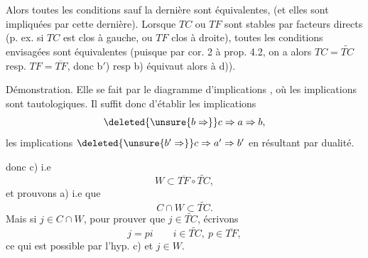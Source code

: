 
Alors toutes les conditions sauf la dernière sont
équivalentes, (et elles sont  impliquées par cette dernière).
 Lorsque $TC$ ou $TF$ sont stables par facteurs directs
(p. ex. si $TC$ est clos à gauche, ou $TF$ clos à droite),
toutes les conditions envisagées sont équivalentes
(puisque par cor. 2 à prop. 4.2, on a alors $TC=\widetilde{TC}$
resp. $TF=\overline{TF}$, donc b$'$) resp b) équivaut alors à
d)).

Démonstration. Elle se fait par le diagramme
d'implications
,
où les  implications   sont
tautologiques. Il suffit donc d'établir les
 implications
\[
\deleted{\unsure{b\Rightarrow}} c\Rightarrow a\Rightarrow b,
\]
les implications $\deleted{\unsure{b'\Rightarrow}}c\Rightarrow a'\Rightarrow b'$ en résultant
par dualité. 

   donc c) i.e
\[
W\subset\overline{TF}\circ\widetilde{TC},
\]
et prouvons a) i.e que
\[
C\cap W\subset\widetilde{TC}.
\]
Mais si $j\in C\cap W$, pour prouver que $j\in\widetilde{TC}$, écrivons
\[
j=pi\qquad i\in\widetilde{TC},\ p\in\overline{TF},
\]
ce qui est possible par l'hyp. c) et $j\in W$.

